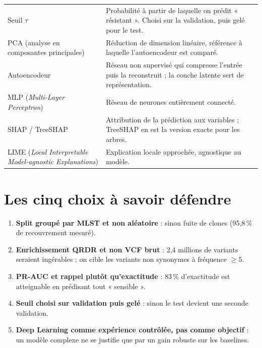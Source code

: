 \documentclass[11pt,a4paper]{article}
\begin{document}
\begin{table}[H]
\begin{tabularx}{\textwidth}{@{}>{\raggedright\arraybackslash}p{3.1cm}>{\raggedright\arraybackslash}X@{}}
Seuil $\tau$ & Probabilité à partir de laquelle on prédit « résistant ». Choisi sur la validation, puis gelé pour le test. \\
PCA (analyse en composantes principales) & Réduction de dimension linéaire, référence à laquelle l'autoencodeur est comparé. \\
Autoencodeur & Réseau non supervisé qui compresse l'entrée puis la reconstruit ; la couche latente sert de représentation. \\
MLP (\emph{Multi-Layer Perceptron}) & Réseau de neurones entièrement connecté. \\
SHAP / TreeSHAP & Attribution de la prédiction aux variables ; TreeSHAP en est la version exacte pour les arbres. \\
LIME (\emph{Local Interpretable Model-agnostic Explanations}) & Explication locale approchée, agnostique au modèle. \\
\bottomrule
\end{tabularx}
\end{table}

\section{Les cinq choix à savoir défendre}

\begin{enumerate}[leftmargin=1.4em]
    \item \textbf{Split groupé par MLST et non aléatoire} : sinon fuite de clones (95,8\,\% de recouvrement mesuré).
    \item \textbf{Enrichissement QRDR et non VCF brut} : 2,4 millions de variants seraient ingérables ; on cible les variants non synonymes à fréquence $\geq 5$.
    \item \textbf{PR-AUC et rappel plutôt qu'exactitude} : 83\,\% d'exactitude est atteignable en prédisant tout « sensible ».
    \item \textbf{Seuil choisi sur validation puis gelé} : sinon le test devient une seconde validation.
    \item \textbf{Deep Learning comme expérience contrôlée, pas comme objectif} : un modèle complexe ne se justifie que par un gain robuste sur les baselines.
\end{enumerate}
\end{document}
